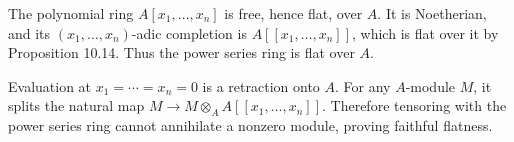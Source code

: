 The polynomial ring $A[x_1,\ldots,x_n]$ is free, hence flat, over $A$. It is Noetherian, and its $(x_1,\ldots,x_n)$-adic completion is $A[[x_1,\ldots,x_n]]$, which is flat over it by Proposition 10.14. Thus the power series ring is flat over $A$.

Evaluation at $x_1=\cdots=x_n=0$ is a retraction onto $A$. For any $A$-module $M$, it splits the natural map $M\to M\otimes_A A[[x_1,\ldots,x_n]]$. Therefore tensoring with the power series ring cannot annihilate a nonzero module, proving faithful flatness.
